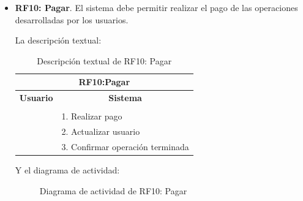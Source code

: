 \begin{itemize}
	\FloatBarrier
	\item \textbf{RF10: Pagar}. El sistema debe permitir realizar el pago de las operaciones desarrolladas por los usuarios.
	
	La descripción textual:
	\begin{table}[h]
		\centering	
		\begin{tabular}{|l|l|}
			\hline
			\multicolumn{2}{|c|}{\textbf{RF10:Pagar}} \\ \hline
			\multicolumn{1}{|c|}{\textbf{Usuario}} & \multicolumn{1}{c|}{\textbf{Sistema}} \\ \hline
			[Pto. inclusión: RF06: Coger bicicleta] &\\ \hline
			& 1. Realizar pago \\ \hline
			& 2. Actualizar usuario \\ \hline 
			& 3. Confirmar operación terminada \\ \hline 	
		\end{tabular}
		\caption{Descripción textual de RF10: Pagar}
		\label{tab:tablaDescTextualRF10}
	\end{table}
	
	Y el diagrama de actividad:
	\begin{figure}[!htb]
		\centering
		\caption{Diagrama de actividad de RF10: Pagar}
		\label{fig:diagramaActividad_RF10}
	\end{figure}
	

\end{itemize}
